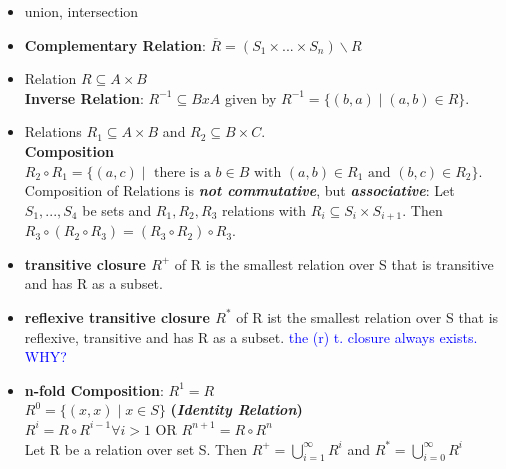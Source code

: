 \begin{itemize}[noitemsep,topsep=0pt,leftmargin=*]
    \item union, intersection
    \item \textbf{Complementary Relation}: $\overline{R} = (S_1 \times ... \times S_n) \backslash R$ 
    \item Relation $R \subseteq A \times B$ \\
    \textbf{Inverse Relation}: $R^{-1} \subseteq B x A$ given by $R^{-1} = \{(b, a) \mid (a,b) \in R\}$. 
    \item Relations $R_1 \subseteq A \times B$ and $R_2 \subseteq B \times C$. \\ \textbf{Composition} $R_2 \circ R_1 = \{(a,c) \mid \text{ there is a } b \in B \text{ with } (a,b) \in R_1 \text{ and } (b,c) \in R_2 \}$. 
    Composition of Relations is \textbf{\textit{not commutative}}, but\textbf{ \textit{associative}}: Let $S_1, ..., S_4$ be sets and $R_1, R_2, R_3$ relations with $R_i \subseteq S_i \times S_{i+1}$. Then $R_3 \circ (R_2 \circ R_3) = (R_3 \circ R_2) \circ R_3$. 
    \item \textbf{transitive closure $R^+$} of R is the smallest relation over S that is transitive and has R as a subset. 
    \item \textbf{reflexive transitive closure $R^*$} of R ist the smallest relation over S that is reflexive, transitive and has R as a subset. \textcolor{blue}{the (r) t. closure always exists. WHY?}
    \item \textbf{n-fold Composition}: $R^1 = R$\\
    $R^0 = \{(x, x) \mid x \in S \}$ \textbf{(\textit{Identity Relation}) \\}
    $R^i = R \circ R^{i-1} \forall i > 1$ OR $R^{n+1} = R \circ R^{n}$ \\ 
    Let R be a relation over set S. Then $R^+ = \bigcup_{i=1}^{\infty}R^i$ and $R^* = \bigcup_{i=0}^{\infty}R^i$ 
\end{itemize} 